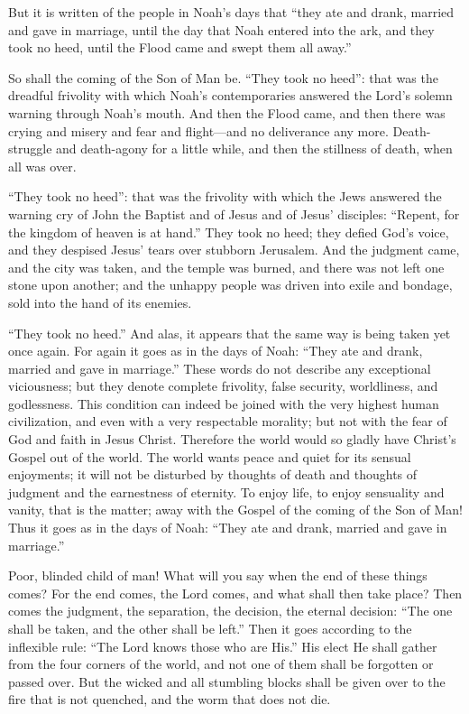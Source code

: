 But it is written of the people in Noah’s days that “they ate and drank, married and gave in marriage, until the day that Noah entered into the ark, and they took no heed, until the Flood came and swept them all away.”

So shall the coming of the Son of Man be. “They took no heed”: that was the dreadful frivolity with which Noah’s contemporaries answered the Lord’s solemn warning through Noah’s mouth. And then the Flood came, and then there was crying and misery and fear and flight—and no deliverance any more. Death-struggle and death-agony for a little while, and then the stillness of death, when all was over.

“They took no heed”: that was the frivolity with which the Jews answered the warning cry of John the Baptist and of Jesus and of Jesus’ disciples: “Repent, for the kingdom of heaven is at hand.” They took no heed; they defied God’s voice, and they despised Jesus’ tears over stubborn Jerusalem. And the judgment came, and the city was taken, and the temple was burned, and there was not left one stone upon another; and the unhappy people was driven into exile and bondage, sold into the hand of its enemies.

“They took no heed.” And alas, it appears that the same way is being taken yet once again. For again it goes as in the days of Noah: “They ate and drank, married and gave in marriage.” These words do not describe any exceptional viciousness; but they denote complete frivolity, false security, worldliness, and godlessness. This condition can indeed be joined with the very highest human civilization, and even with a very respectable morality; but not with the fear of God and faith in Jesus Christ. Therefore the world would so gladly have Christ’s Gospel out of the world. The world wants peace and quiet for its sensual enjoyments; it will not be disturbed by thoughts of death and thoughts of judgment and the earnestness of eternity. To enjoy life, to enjoy sensuality and vanity, that is the matter; away with the Gospel of the coming of the Son of Man! Thus it goes as in the days of Noah: “They ate and drank, married and gave in marriage.”

Poor, blinded child of man! What will you say when the end of these things comes? For the end comes, the Lord comes, and what shall then take place? Then comes the judgment, the separation, the decision, the eternal decision: “The one shall be taken, and the other shall be left.” Then it goes according to the inflexible rule: “The Lord knows those who are His.” His elect He shall gather from the four corners of the world, and not one of them shall be forgotten or passed over. But the wicked and all stumbling blocks shall be given over to the fire that is not quenched, and the worm that does not die.

